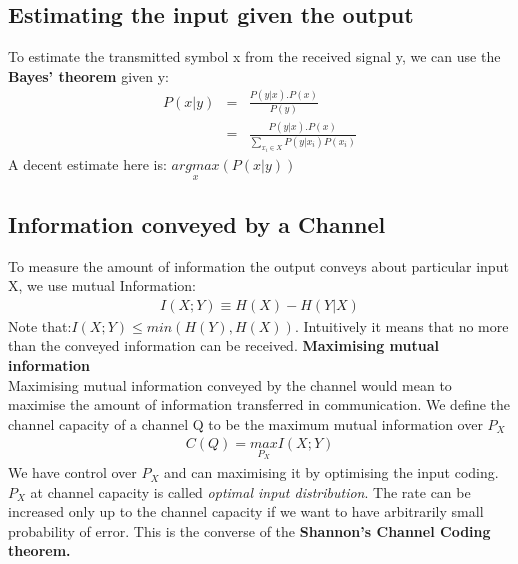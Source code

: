 \documentclass[10pt,twocolumn,letterpaper]{article}
\begin{document}
\subsection{Estimating the input given the output}
To estimate the transmitted symbol x from the received signal y, we can use the \textbf{Bayes' theorem} given y:
\begin{eqnarray*}
P(x|y)&=&\frac{P(y|x).P(x)}{P(y)}\\
&=&\frac{P(y|x).P(x)}{\sum_{x_i\in X}P(y|x_i)P(x_i)}
\end{eqnarray*}
A decent estimate here is: $\underset{x}{argmax}(P(x|y))$

\subsection{Information conveyed by a Channel}
    To measure the amount of information the output conveys about particular input X, we use mutual Information:
    \begin{eqnarray*}
        I(X;Y)\equiv H(X)-H(Y|X)
    \end{eqnarray*}
    Note that:$I(X;Y)\leq min(H(Y),H(X))$. Intuitively it means that no more than the conveyed information can be received.
    \textbf{Maximising mutual information}\\
    Maximising mutual information conveyed by the channel would mean to maximise the amount of information transferred in communication. We define the channel capacity of a channel Q to be the maximum mutual information over $P_X$
    \begin{eqnarray*}
        C(Q)=\underset{P_X}{max}I(X;Y)
    \end{eqnarray*}
    We have control over $P_X$ and can maximising it by optimising the input coding. $P_X$ at channel capacity is called \textit{optimal input distribution}. The rate can be increased only up to the channel capacity if we want to have arbitrarily small probability of error. This is the converse of the \textbf{Shannon's Channel Coding theorem.}
\end{document}
